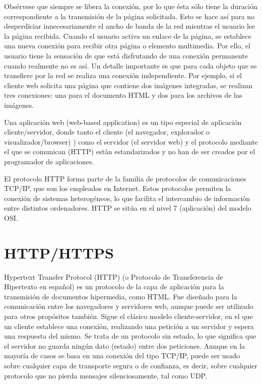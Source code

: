 Obsérvese que siempre se libera la conexión, por lo que ésta sólo tiene la duración
correspondiente a la transmisión de la página solicitada. Esto se hace así para no
desperdiciar innecesariamente el ancho de banda de la red mientras el usuario lee la
página recibida.
Cuando el usuario activa un enlace de la página, se establece una nueva conexión
para recibir otra página o elemento multimedia. Por ello, el usuario tiene la sensación
de que está disfrutando de una conexión permanente cuando realmente no es así.
Un detalle importante es que para cada objeto que se transfiere por la red se realiza
una conexión independiente. Por ejemplo, si el cliente web solicita una página que
contiene dos imágenes integradas, se realizan tres conexiones: una para el documento
HTML y dos para los archivos de las imágenes.

Una aplicación web (web-based application) es un tipo especial de aplicación cliente/servidor, donde tanto el cliente (el navegador, explorador o visualizador/browser)
) como
el servidor (el servidor web) y el protocolo mediante el que se comunican (HTTP)
están estandarizados y no han de ser creados por el programador de aplicaciones.

El protocolo HTTP forma parte de la familia de protocolos de comunicaciones
TCP/IP, que son los empleados en Internet. Estos protocolos permiten la conexión
de sistemas heterogéneos, lo que facilita el intercambio de información entre distintos
ordenadores. HTTP se sitúa en el nivel 7 (aplicación) del modelo OSI.


\section{HTTP/HTTPS}

\cite{mdn}Hypertext Transfer Protocol (HTTP) (o Protocolo de Transferencia de Hipertexto en español) es un protocolo de la capa de aplicación para la transmisión de documentos hipermedia, como HTML. Fue diseñado para la comunicación entre los navegadores y servidores web, aunque puede ser utilizado para otros propósitos también. Sigue el clásico modelo cliente-servidor, en el que un cliente establece una conexión, realizando una petición a un servidor y espera una respuesta del mismo. Se trata de un protocolo sin estado, lo que significa que el servidor no guarda ningún dato (estado) entre dos peticiones. Aunque en la mayoría de casos se basa en una conexión del tipo TCP/IP, puede ser usado sobre cualquier capa de transporte segura o de confianza, es decir, sobre cualquier protocolo que no pierda mensajes silenciosamente, tal como UDP.

